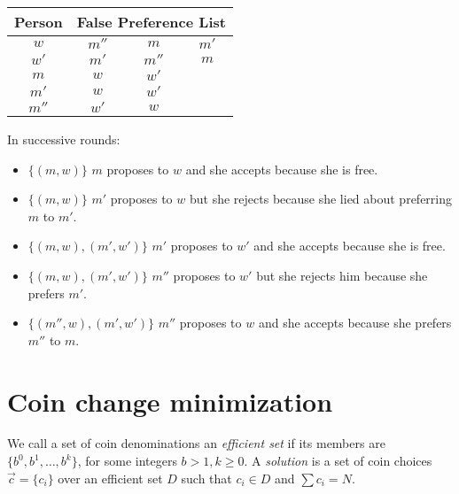 \documentclass[12pt]{article}
\begin{document}
\vspace{\baselineskip}
\begin{tabular}{|c|ccc|}
\hline
Person & \multicolumn{3}{c|}{False Preference List} \\
\hline
$w$ & $m''$ & \textbf{$m$} & \textbf{$m'$} \\
$w'$ & $m'$ & $m''$ & $m$ \\
$m$ & $w$ & $w'$ & \\
$m'$ & $w$ & $w'$ & \\
$m''$ & $w'$ & $w$ & \\
\hline
\end{tabular}
\vspace{\baselineskip}

In successive rounds:
\begin{itemize}
\item
$\{(m,w)\}$ $m$ proposes to $w$ and she accepts because she is free.
\item
$\{(m,w)\}$ $m'$ proposes to $w$ but she rejects because she lied about preferring $m$ to $m'$.
\item
$\{(m,w),(m',w')\}$ $m'$ proposes to $w'$ and she accepts because she is free.
\item
$\{(m,w),(m',w')\}$ $m''$ proposes to $w'$ but she rejects him because she prefers $m'$.
\item
$\{(m'',w),(m',w')\}$ $m''$ proposes to $w$ and she accepts because she prefers $m''$ to $m$.
\end{itemize}

\pagebreak

\section{Coin change minimization}

We call a set of coin denominations an \textit{efficient set} if its
members are $\{b^0, b^1,\ldots ,b^k\}$,
for some integers $b > 1, k \ge 0$.
A \textit{solution} 
is a set of coin choices $\vec{c} = \{c_i\}$ over an efficient set $D$ such that
$c_i \in D$ and $\sum{c_i} = N$.


\end{document}
